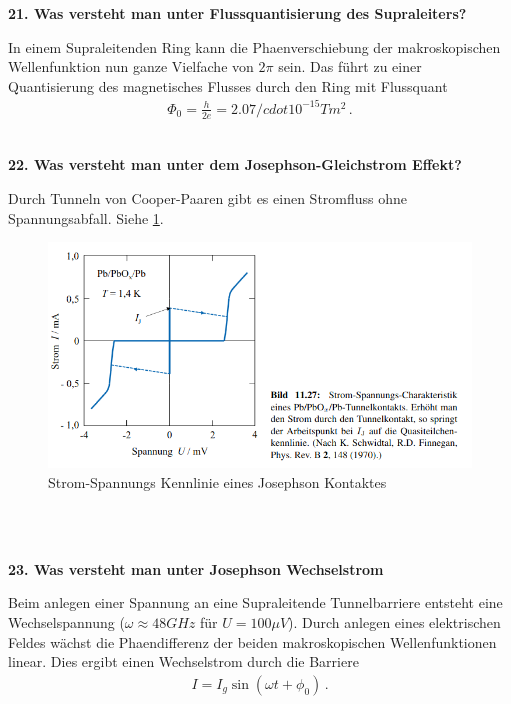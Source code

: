 \noindent\textbf{21. Was versteht man unter Flussquantisierung des Supraleiters?}\\
\begin{addmargin}[25pt]{0pt}
In einem Supraleitenden Ring kann die Phaenverschiebung der makroskopischen Wellenfunktion nun ganze Vielfache von $2\pi$ sein. Das führt zu einer Quantisierung des magnetisches Flusses durch den Ring mit Flussquant
\begin{align}
    \Phi_0 = \frac{h}{2e} = 2.07 /cdot 10^{-15} Tm^2\,.
\end{align}
\\
\end{addmargin}

\noindent\textbf{22. Was versteht man unter dem Josephson-Gleichstrom Effekt?}\\
\begin{addmargin}[25pt]{0pt}
Durch Tunneln von Cooper-Paaren gibt es einen Stromfluss ohne Spannungsabfall. Siehe \ref{fig:Josephson_Gleichstrom}.
\begin{figure}[!h]
    \centering
    \includegraphics[width=0.7\linewidth]{images//KM2/josephson_gleichstrom.PNG}
    \caption{Strom-Spannungs Kennlinie eines Josephson Kontaktes}
    \label{fig:Josephson_Gleichstrom}
\end{figure}\\
\\
\end{addmargin}

\noindent\textbf{23. Was versteht man unter Josephson Wechselstrom}\\
\begin{addmargin}[25pt]{0pt}
Beim anlegen einer Spannung an eine Supraleitende Tunnelbarriere entsteht eine Wechselspannung ($\omega \approx 48GHz$ für $U=100\mu V$). Durch anlegen eines elektrischen Feldes wächst die Phaendifferenz der beiden makroskopischen Wellenfunktionen linear. Dies ergibt einen Wechselstrom durch die Barriere
\begin{align}
    I = I_g \sin(\omega t + \phi_0)\,.
\end{align}\\
\end{addmargin}

